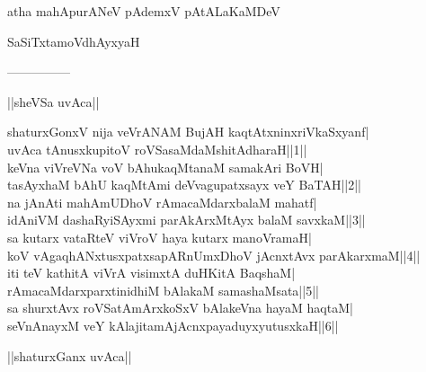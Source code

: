 \documentclass{article}
\begin{document}
\begin{center}
atha mahApurANeV pAdemxV pAtALaKaMDeV
\end{center}

\begin{center}
SaSiTxtamoVdhAyxyaH
\end{center}

\begin{center}
---------------
\end{center}

\begin{center}
||sheVSa uvAca||
\end{center}

shaturxGonxV nija veVrANAM BujAH kaqtAtxninxriVkaSxyanf|\\
uvAca tAnusxkupitoV roVSasaMdaMshitAdharaH||1||\\
keVna viVreVNa voV bAhukaqMtanaM samakAri BoVH|\\
tasAyxhaM bAhU kaqMtAmi deVvagupatxsayx veY BaTAH||2||\\
na jAnAti mahAmUDhoV rAmacaMdarxbalaM mahatf|\\
idAniVM dashaRyiSAyxmi parAkArxMtAyx balaM savxkaM||3||\\
sa kutarx vataRteV viVroV haya kutarx manoVramaH|\\
koV vAgaqhANxtusxpatxsapARnUmxDhoV jAcnxtAvx parAkarxmaM||4||\\
iti teV kathitA viVrA visimxtA duHKitA BaqshaM|\\
rAmacaMdarxparxtinidhiM bAlakaM samashaMsata||5||\\
sa shurxtAvx roVSatAmArxkoSxV bAlakeVna hayaM haqtaM|\\
seVnAnayxM veY kAlajitamAjAcnxpayaduyxyutusxkaH||6||\\

\begin{center}
||shaturxGanx uvAca||
\end{center}
\end{document}

